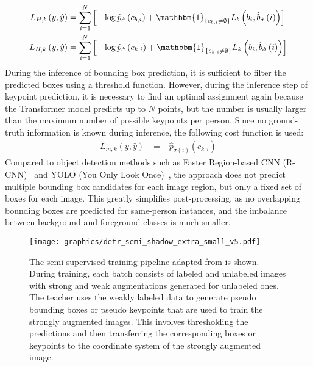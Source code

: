 \documentclass[sigconf]{acmart}
\begin{document}
\begin{align}
L_{H,b}\left(y,\hat{y}\right) &= \sum_{i=1}^{N}\left[-\log\hat{p}_{\hat{\sigma}}\left(c_{b,i}\right)+\mathbbm{1}_{\left\{c_{b,i}\neq\emptyset\right\}}L_{b}\left(b_i,\hat{b}_{\hat{\sigma}}\left(i\right)\right)\right]\\
L_{H,k}\left(y,\hat{y}\right) &= \sum_{i=1}^{N}\left[-\log\hat{p}_{\hat{\sigma}}\left(c_{k,i}\right)+\mathbbm{1}_{\left\{c_{k,i}\neq\emptyset\right\}}L_{k}\left(b_i,\hat{b}_{\hat{\sigma}}\left(i\right)\right)\right]
\end{align}
During the inference of bounding box prediction, it is sufficient to filter the predicted boxes using a threshold function. However, during the inference step of keypoint prediction, it is necessary to find an optimal assignment again because the Transformer model predicts up to $N$ points, but the number is usually larger than the maximum number of possible keypoints per person. Since no ground-truth information is known during inference, the following cost function is used:
\begin{align}
    L_{m, k}\left(y,\hat{y}\right)&= -\hat{p}_{\sigma\left(i\right)}\left(c_{k,i}\right)
\end{align}
Compared to object detection methods such as Faster Region-based CNN (R-CNN)~\cite{DBLP:conf/nips/RenHGS15} and YOLO (You Only Look Once)~\cite{DBLP:conf/cvpr/RedmonF17}, the approach does not predict multiple bounding box candidates for each image region, but only a fixed set of boxes for each image. 
This greatly simplifies post-processing, as no overlapping bounding boxes are predicted for same-person instances, and the imbalance between background and foreground classes is much smaller.


\begin{figure}
\begin{center}
\texttt{[image: graphics/detr\_semi\_shadow\_extra\_small\_v5.pdf]}
\end{center}
\caption{The semi-supervised training pipeline adapted from \citet{DBLP:conf/iccv/Xu00WWWB021} is shown. During training, each batch consists of labeled and unlabeled images with strong and weak augmentations generated for unlabeled ones. The teacher uses the weakly labeled data to generate pseudo bounding boxes or pseudo keypoints that are used to train the strongly augmented images. This involves thresholding the predictions and then transferring the corresponding boxes or keypoints to the coordinate system of the strongly augmented image.}
\label{fig:semi}
\end{figure}
\end{document}
